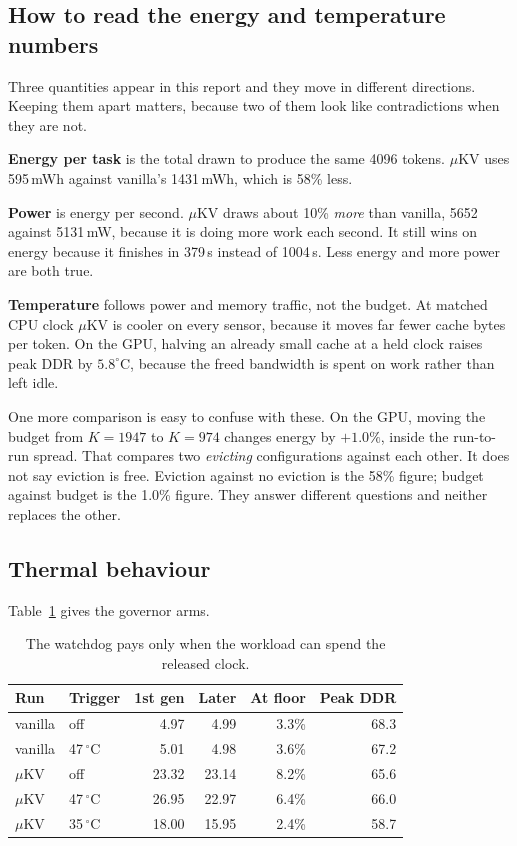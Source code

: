 \documentclass[11pt]{article}
\begin{document}
\subsection{How to read the energy and temperature numbers}
Three quantities appear in this report and they move in different directions. Keeping them
apart matters, because two of them look like contradictions when they are not.

\textbf{Energy per task} is the total drawn to produce the same 4096 tokens. $\mu$KV uses
595\,mWh against vanilla's 1431\,mWh, which is 58\% less.

\textbf{Power} is energy per second. $\mu$KV draws about 10\% \emph{more} than vanilla,
5652 against 5131\,mW, because it is doing more work each second. It still wins on energy
because it finishes in 379\,s instead of 1004\,s. Less energy and more power are both true.

\textbf{Temperature} follows power and memory traffic, not the budget. At matched CPU clock
$\mu$KV is cooler on every sensor, because it moves far fewer cache bytes per token. On the
GPU, halving an already small cache at a held clock raises peak DDR by $5.8^\circ$C, because
the freed bandwidth is spent on work rather than left idle.

One more comparison is easy to confuse with these. On the GPU, moving the budget from
$K{=}1947$ to $K{=}974$ changes energy by $+1.0\%$, inside the run-to-run spread. That
compares two \emph{evicting} configurations against each other. It does not say eviction is
free. Eviction against no eviction is the 58\% figure; budget against budget is the 1.0\%
figure. They answer different questions and neither replaces the other.

\subsection{Thermal behaviour}
Table~\ref{tab:thermal} gives the governor arms.
\begin{table}[h]\centering\small
\caption{The watchdog pays only when the workload can spend the released clock.}
\label{tab:thermal}
\begin{tabular}{@{}llrrrr@{}}
\toprule
\textbf{Run} & \textbf{Trigger} & \textbf{1st gen} & \textbf{Later} &
\textbf{At floor} & \textbf{Peak DDR}\\
\midrule
vanilla & off & 4.97 & 4.99 & 3.3\% & 68.3\\
vanilla & 47\,$^\circ$C & 5.01 & 4.98 & 3.6\% & 67.2\\
$\mu$KV & off & 23.32 & 23.14 & 8.2\% & 65.6\\
\rowcolor{cA!8} $\mu$KV & 47\,$^\circ$C & 26.95 & 22.97 & 6.4\% & 66.0\\
$\mu$KV & 35\,$^\circ$C & 18.00 & 15.95 & 2.4\% & 58.7\\
\bottomrule
\end{tabular}
\end{table}
\end{document}
